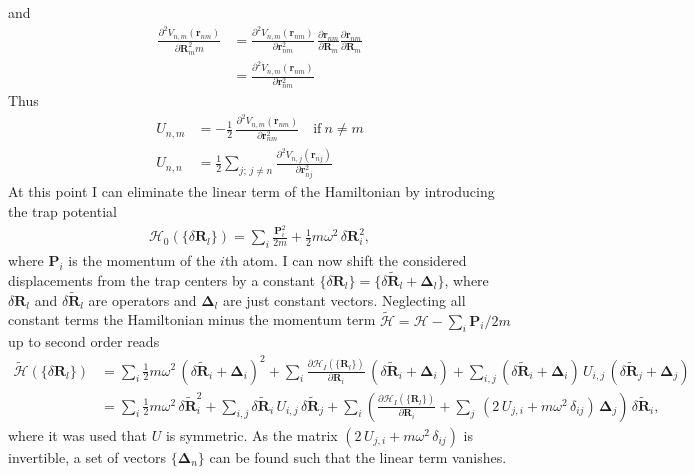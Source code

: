 and
\begin{align*}
    \frac{\partial^2 V_{n,m}(\mathbf{r}_{nm})}{\partial \mathbf{R}_m^2m}
    &= \frac{\partial^2 V_{n,m}(\mathbf{r}_{nm})}{\partial\mathbf{r}_{nm}^2}\,  \frac{\partial \mathbf{r}_{nm}}{\partial\mathbf{R}_{m}}\frac{\partial \mathbf{r}_{nm}}{\partial\mathbf{R}_{m}}\\
    &=\frac{\partial^2 V_{n,m}(\mathbf{r}_{nm})}{\partial\mathbf{r}_{nm}^2}
\end{align*}
Thus
\begin{align*}
    U_{n,m}&=
        -\frac12\,\frac{\partial^2 V_{n,m}(\mathbf{r}_{nm})}{\partial\mathbf{r}_{nm}^2}\quad\text{if}\:n\neq m\\
    U_{n,n} &= \frac12\sum_{j;\,j\neq n}\frac{\partial^2 V_{n,j}(\mathbf{r}_{nj})}{\partial\mathbf{r}_{nj}^2}
\end{align*}
At this point I can eliminate the linear term of the Hamiltonian by introducing the trap potential 
\begin{align*}
    \mathcal{H}_0(\{\delta\mathbf{R}_l\}) = \sum_i\frac{\mathbf{P}_i^2}{2m}+ \frac12 m \omega^2 \,\delta\mathbf{R}_i^2,
\end{align*}
where $\mathbf{P}_i$ is the momentum of the $i$th atom. I can now shift the considered displacements from the trap centers by a constant $\{\delta\mathbf{R}_l\}=\{\delta\tilde{\mathbf{R}}_l+\mathbf{\Delta}_l\}$, where $\delta\mathbf{R}_l$ and $\delta\tilde{\mathbf{R}}_l$ are operators and $\mathbf{\Delta}_l$ are just constant vectors. Neglecting all constant terms the Hamiltonian minus the momentum term $\tilde{\mathcal{H}}=\mathcal{H}-\sum_i\mathbf{P}_i/2m$ up to second order reads
\begin{align*}
    \tilde{\mathcal{H}}(\{\delta\mathbf{R}_l\})&= \sum_i \frac12 m \omega^2 \,(\delta\tilde{\mathbf{R}}_i+\mathbf{\Delta}_i)^2+ \sum_i\frac{\partial \mathcal{H}_I(\{\mathbf{R}_l\})}{\partial \mathbf{R}_i}\,(\delta\tilde{\mathbf{R}}_i+\mathbf{\Delta}_i) + \sum_{i,j}(\delta\tilde{\mathbf{R}}_i+\mathbf{\Delta}_i)\,U_{i,j}\,(\delta\tilde{\mathbf{R}}_j+\mathbf{\Delta}_j)\\
    &= \sum_i \frac12 m \omega^2 \,\delta\tilde{\mathbf{R}}_i^2  + \sum_{i,j}\delta\tilde{\mathbf{R}}_i\,U_{i,j}\,\delta\tilde{\mathbf{R}}_j + \sum_i\left(\frac{\partial \mathcal{H}_I(\{\mathbf{R}_l\})}{\partial \mathbf{R}_i} +\sum_j\,\left( 2\, U_{j,i} + m\omega^2\,\delta_{ij}\right)\,\mathbf{\Delta}_j  \right)\,\delta\tilde{\mathbf{R}}_i,
\end{align*}
where it was used that $U$ is symmetric. As the matrix $\left( 2\, U_{j,i} + m\omega^2\,\delta_{ij}\right)$ is invertible, a set of vectors $\{\mathbf{\Delta}_n\}$ can be found such that the linear term vanishes.
